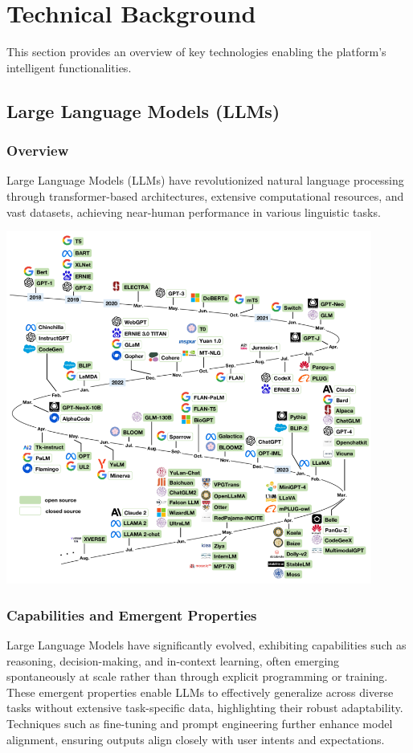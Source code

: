 \section{Technical Background}
This section provides an overview of key technologies enabling the platform's intelligent functionalities.

\subsection{Large Language Models (LLMs)}

\subsubsection{Overview}
Large Language Models (LLMs) have revolutionized natural language processing through transformer-based architectures, extensive computational resources, and vast datasets, achieving near-human performance in various linguistic tasks.

\begin{center}
    \centering
    \includegraphics[width=0.9\textwidth]{Images/evolution chronologic LLM.png}
     \cite{llmEvolution}
    \label{fig:llmEvolution}
\end{center}

\subsubsection{Capabilities and Emergent Properties}
Large Language Models have significantly evolved, exhibiting capabilities such as reasoning, decision-making, and in-context learning, often emerging spontaneously at scale rather than through explicit programming or training. These emergent properties enable LLMs to effectively generalize across diverse tasks without extensive task-specific data, highlighting their robust adaptability. Techniques such as fine-tuning and prompt engineering further enhance model alignment, ensuring outputs align closely with user intents and expectations.\mynewline

